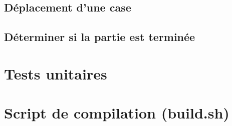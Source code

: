 		\subsection{Déplacement d'une case}



		\subsection{Déterminer si la partie est terminée}



	\section{Tests unitaires}



	\section{Script de compilation (build.sh)}
